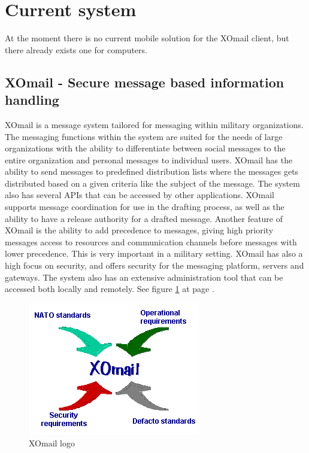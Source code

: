 \section{Current system}

At the moment there is no current mobile solution for the XOmail client, but there already exists one for computers.

\subsection{XOmail - Secure message based information handling}

XOmail is a message system tailored for messaging within military organizations. The messaging functions within the system are suited for the needs of large organizations with the ability to differentiate between social messages to the entire organization and personal messages to individual users. XOmail has the ability to send messages to predefined  distribution lists where the messages gets distributed based on a given criteria like the subject of the message. 
\newline
\newline
The system also has several APIs that can be accessed by other applications. XOmail supports message coordination for use in the drafting process, as well as the ability to have a release authority for a drafted message. Another feature of XOmail is the ability to add precedence to messages, giving high priority messages access to resources and communication channels before messages with lower precedence. This is very important in a military setting. 
\newline
\newline
XOmail has also a high focus on security, and offers security for the messaging platform, servers and gateways. The system also has an extensive administration tool that can be accessed both locally and remotely.
\newline
\newline
See figure \ref{fig:xomail} at page \pageref{fig:xomail}.
\begin{figure}[h!]
\begin{center}
\includegraphics{xomaillogo}
\end{center}
\caption{XOmail logo} \label{fig:xomail}
\end{figure}